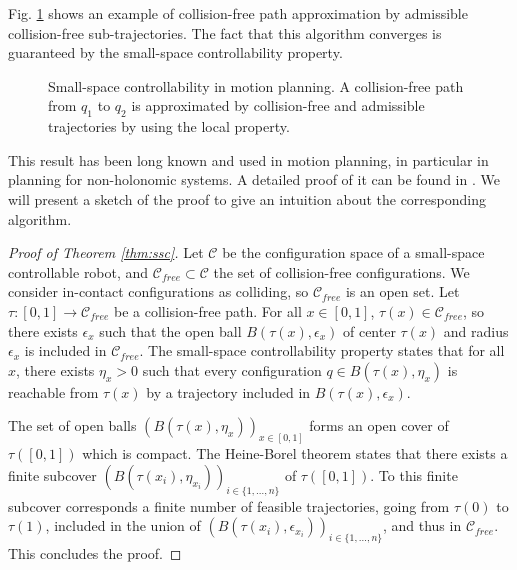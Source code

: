 \documentclass{article}
\begin{document}
Fig. \ref{fig:ssc2} shows an example of collision-free 
path approximation by admissible collision-free sub-trajectories. The fact 
that this algorithm  converges is guaranteed by the small-space
controllability property.

\begin{figure}[h]
  \centering

  

  \caption{Small-space controllability in motion planning. 
    A collision-free path from
    $q_1$ to $q_2$ is approximated by collision-free and admissible
    trajectories by using the local property.
  }
  \label{fig:ssc2}
\end{figure}

This result has been long known and used in motion planning, in particular in planning
for non-holonomic systems. A detailed proof of it can be found in
\cite{taix-94}. We will present a sketch of the proof to give an intuition about the 
corresponding algorithm.

\begin{proof}[Proof of Theorem \ref{thm:ssc}]
  Let $\mathcal{C}$ be the configuration space of a small-space controllable robot, and 
  $\mathcal{C}_{free} \subset \mathcal{C}$ the set of collision-free configurations. We
  consider in-contact configurations as colliding, so $\mathcal{C}_{free}$ is an open set.
  Let $\tau : [0,1] \rightarrow \mathcal{C}_{free}$ be a collision-free path. For all $x \in [0,1]$,
  $\tau(x) \in \mathcal{C}_{free}$, so there exists $\epsilon_x$ such that the open ball 
  $B(\tau(x),\epsilon_x)$ of center $\tau(x)$ and radius $\epsilon_x$ is included in 
  $\mathcal{C}_{free}$. The small-space controllability property states that for all $x$,
  there exists $\eta_x > 0$ such that every configuration $q \in B(\tau(x),\eta_x)$ is reachable 
  from $\tau(x)$ by a trajectory included in $B(\tau(x),\epsilon_x)$.

  The set of open balls $\left( B(\tau(x),\eta_x) \right)_{x\in [0,1]}$ forms an open cover
  of $\tau([0,1])$ which is compact. The Heine-Borel theorem states that there exists a
  finite subcover $\left( B(\tau(x_i),\eta_{x_i}) \right)_{i\in \{ 1,\dots ,n \}}$ of $\tau([0,1])$. To this
  finite subcover corresponds a finite number of feasible trajectories, going from $\tau(0)$ to  
  $\tau(1)$, included in the union of 
  $\left( B(\tau(x_i),\epsilon_{x_i}) \right)_{i\in \{ 1,\dots ,n \}}$, and thus in 
  $\mathcal{C}_{free}$. This concludes the proof.
\end{proof}
\end{document}
